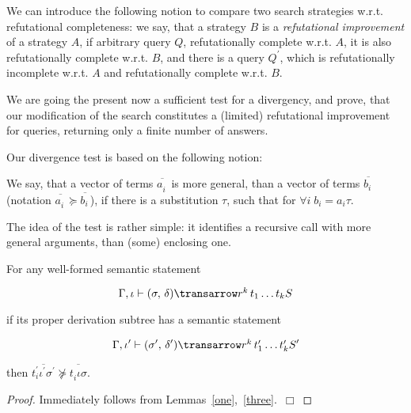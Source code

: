 We can introduce the following notion to compare two search strategies w.r.t. refutational completeness: 
we say, that a strategy $B$ is a \emph{refutational improvement} of a strategy $A$, if arbitrary
query $Q$, refutationally complete w.r.t. $A$, it is also refutationally complete w.r.t. $B$, and there
is a query $Q^\prime$, which is refutationally incomplete w.r.t. $A$ and refutationally complete
w.r.t. $B$. 

We are going the present now a sufficient test for a divergency, and prove, that our modification of
the search constitutes a (limited) refutational improvement for queries, returning only a finite number of answers.

Our divergence test is based on the following notion:

\begin{definition}
\normalfont 
We say, that a vector of terms $\overline{a^{\phantom{x}}_i}$ is more general, than a vector of terms $\overline{b^{\phantom{x}}_i}$ (notation 
$\overline{a^{\phantom{x}}_i}\succeq\overline{b^{\phantom{x}}_i}$), if there is a substitution $\tau$, such that for $\forall i\;b_i = a_i \tau$.
\end{definition}

The idea of the test is rather simple: it identifies a recursive call with more general arguments, 
than (some) enclosing one. 


\begin{theorem}
\normalfont
For any well-formed semantic statement 

$$
\otrans{\Gamma,\iota}{(\sigma,\,\delta)}{r^k\,t_1\dots t_k}{S}
$$ 

if its proper derivation subtree has a semantic statement 

$$
\otrans{\Gamma,\iota^\prime}{(\sigma^\prime,\,\delta^\prime)}{r^k\,t^\prime_1\dots t^\prime_k}{S^\prime}
$$

then $\overline{t^\prime_i \iota^\prime \sigma^\prime} \not \succeq \overline{t^{\phantom{\prime}}_i \iota \sigma}$. 
\end{theorem}
\begin{proof}
Immediately follows from Lemmas~\ref{one},~\ref{three}.~$\Box$
\end{proof}
